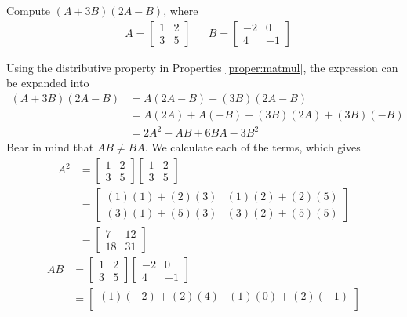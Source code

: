 \begin{exmp}
Compute $(A+3B)(2A-B)$, where
\begin{align*}
& A = 
\begin{bmatrix}
1 & 2 \\
3 & 5 
\end{bmatrix} &
& B = 
\begin{bmatrix}
-2 & 0 \\
4 & -1
\end{bmatrix}
\end{align*}
\end{exmp}
\begin{solution}
Using the distributive property in Properties \ref{proper:matmul}, the expression can be expanded into
\begin{align*}
(A+3B)(2A-B) &= A(2A-B) + (3B)(2A-B)\\
&= A(2A) + A(-B) + (3B)(2A) + (3B)(-B) \\
&= 2A^2 - AB + 6BA - 3B^2
\end{align*}
Bear in mind that $AB \neq BA$. We calculate each of the terms, which gives
\begin{align*}
A^2 &=
\begin{bmatrix}
1 & 2 \\
3 & 5 
\end{bmatrix}
\begin{bmatrix}
1 & 2 \\
3 & 5 
\end{bmatrix} \\
&=
\begin{bmatrix}
(1)(1)+(2)(3) & (1)(2)+(2)(5) \\
(3)(1)+(5)(3) & (3)(2)+(5)(5) 
\end{bmatrix} \\
&=
\begin{bmatrix}
7 & 12 \\
18 & 31 
\end{bmatrix}
\end{align*}
\begin{align*}
AB &= 
\begin{bmatrix}
1 & 2 \\
3 & 5 
\end{bmatrix}
\begin{bmatrix}
-2 & 0 \\
4 & -1
\end{bmatrix} \\
&=
\begin{bmatrix}
(1)(-2)+(2)(4) & (1)(0)+(2)(-1) \\

\end{bmatrix}
\end{align*}
\end{solution}
